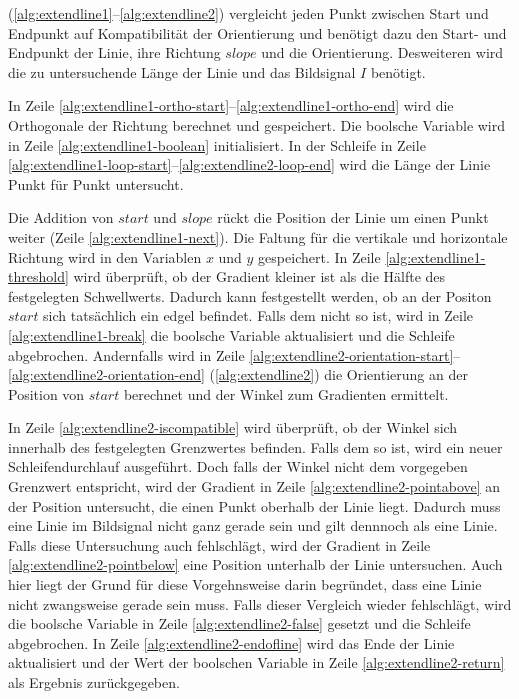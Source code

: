 

 (\autoref{alg:extendline1}--\autoref{alg:extendline2}) vergleicht jeden Punkt zwischen Start und
 Endpunkt auf Kompatibilität der Orientierung und benötigt dazu den Start- und Endpunkt der Linie, ihre Richtung
 $\mathit{slope}$ und die Orientierung. Desweiteren wird die zu untersuchende Länge der Linie und das Bildsignal $I$
 benötigt.



In Zeile \ref{alg:extendline1-ortho-start}--\ref{alg:extendline1-ortho-end} wird die Orthogonale der Richtung berechnet
 und gespeichert. Die boolsche Variable wird in Zeile \ref{alg:extendline1-boolean} initialisiert. In der Schleife in
 Zeile \ref{alg:extendline1-loop-start}--\ref{alg:extendline2-loop-end} wird die Länge der Linie Punkt für Punkt
 untersucht.

Die Addition von $\mathit{start}$ und $\mathit{slope}$ rückt die Position der Linie um einen Punkt weiter (Zeile
 \ref{alg:extendline1-next}). Die Faltung für die vertikale und horizontale Richtung wird in den Variablen $x$ und $y$
 gespeichert. In Zeile \ref{alg:extendline1-threshold} wird überprüft, ob der Gradient kleiner ist als die Hälfte des
 festgelegten Schwellwerts. Dadurch kann festgestellt werden, ob an der Positon $\mathit{start}$ sich tatsächlich ein
 \gls{edgel} befindet. Falls dem nicht so ist, wird in Zeile \ref{alg:extendline1-break} die boolsche Variable
 aktualisiert und die Schleife abgebrochen. Andernfalls wird in Zeile
 \ref{alg:extendline2-orientation-start}--\ref{alg:extendline2-orientation-end} (\autoref{alg:extendline2}) die
 Orientierung an der Position von $\mathit{start}$ berechnet und der Winkel zum Gradienten ermittelt.



In Zeile \ref{alg:extendline2-iscompatible} wird überprüft, ob der Winkel sich innerhalb des festgelegten Grenzwertes
 befinden. Falls dem so ist, wird ein neuer Schleifendurchlauf ausgeführt. Doch falls der Winkel nicht dem vorgegeben
 Grenzwert entspricht, wird der Gradient in Zeile \ref{alg:extendline2-pointabove} an der Position untersucht, die
 einen Punkt oberhalb der Linie liegt. Dadurch muss eine Linie im Bildsignal nicht ganz gerade sein und gilt dennnoch
 als eine Linie. Falls diese Untersuchung auch fehlschlägt, wird der Gradient in Zeile \ref{alg:extendline2-pointbelow}
 eine Position unterhalb der Linie untersuchen. Auch hier liegt der Grund für diese Vorgehnsweise darin begründet, dass
 eine Linie nicht zwangsweise gerade sein muss. Falls dieser Vergleich wieder fehlschlägt, wird die boolsche Variable
 in Zeile \ref{alg:extendline2-false} gesetzt und die Schleife abgebrochen. In Zeile
 \ref{alg:extendline2-endofline} wird das Ende der Linie aktualisiert und der Wert der boolschen Variable in Zeile
 \ref{alg:extendline2-return} als Ergebnis zurückgegeben.

